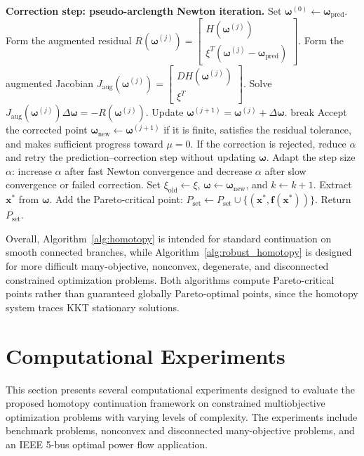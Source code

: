 \documentclass[11pt,pdflatex,sn-mathphys-ay]{sn-jnl}%
\theoremstyle{definition}
\theoremstyle{thmstyleone}%
\theoremstyle{thmstyletwo}%
\theoremstyle{thmstylethree}%
\newcommand{\add}[1]{\textcolor{revisionblue}{#1}}
\begin{document}
\begin{algorithm}[htbp]
\begin{algorithmic}[1]
			\STATE \textbf{Correction step: pseudo-arclength Newton iteration.}
			\STATE Set $\bm{\omega}^{(0)}\gets\bm{\omega}_{\mathrm{pred}}$.
			\STATE Form the augmented residual
			$R(\bm{\omega}^{(j)})=
			\begin{bmatrix}
				H(\bm{\omega}^{(j)})\\
				\xi^T(\bm{\omega}^{(j)}-\bm{\omega}_{\mathrm{pred}})
			\end{bmatrix}.$
			\STATE Form the augmented Jacobian
			$J_{\mathrm{aug}}(\bm{\omega}^{(j)})=
			\begin{bmatrix}
				DH(\bm{\omega}^{(j)})\\
				\xi^T
			\end{bmatrix}.$
			\STATE Solve $J_{\mathrm{aug}}(\bm{\omega}^{(j)})\Delta\bm{\omega}
			=
			-R(\bm{\omega}^{(j)}).$
			\STATE Update
			$\bm{\omega}^{(j+1)}=\bm{\omega}^{(j)}+\Delta\bm{\omega}.$     
			\STATE break
			\ENDIF
			\ENDFOR
			\STATE Accept the corrected point $\bm{\omega}_{\mathrm{new}}\gets\bm{\omega}^{(j+1)}$ if it is finite, satisfies the residual tolerance, and makes sufficient progress toward $\mu=0$.
			\STATE \add{ If the correction is rejected, reduce $\alpha$ and retry the prediction--correction step without updating $\bm{\omega}$. }      
			\STATE Adapt the step size $\alpha$: increase $\alpha$ after fast Newton convergence and decrease $\alpha$ after slow convergence or failed correction.
			\STATE Set $\xi_{\mathrm{old}}\gets\xi$, $\bm{\omega}\gets\bm{\omega}_{\mathrm{new}}$, and $k\gets k+1$.
			\ENDWHILE
			\IF{$|\mu|\leq\epsilon$}
			\STATE Extract $\bm{x}^*$ from $\bm{\omega}$.
			\STATE Add the Pareto-critical point:
			$P_{\mathrm{set}}\gets P_{\mathrm{set}}\cup\{(\bm{x}^*,\bm f(\bm{x}^*))\}.$
			\ENDIF
			\ENDFOR
			\ENDFOR
			\STATE Return $P_{\mathrm{set}}$.
		\end{algorithmic}
	\end{algorithm}
	Overall, Algorithm~\ref{alg:homotopy} is intended for standard continuation on smooth connected branches, while Algorithm~\ref{alg:robust_homotopy} is designed for more difficult many-objective, nonconvex, degenerate, and disconnected constrained optimization problems. 
	Both algorithms compute Pareto-critical points rather than guaranteed globally Pareto-optimal points, since the homotopy system traces KKT stationary solutions.
	
	\section{Computational Experiments}
	\label{sec:numerical}
	This section presents several computational experiments designed to evaluate the proposed homotopy continuation framework on constrained multiobjective optimization problems with varying levels of complexity. The experiments include benchmark problems, nonconvex and disconnected many-objective problems, and an IEEE 5-bus optimal power flow application.
	
\end{document}
